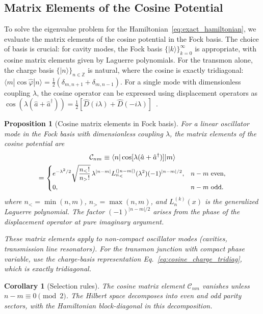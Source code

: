 \documentclass[reprint, floatfix, superscriptaddress, amsmath, amssymb, longbibliography]{revtex4-2}
\newtheorem{proposition}[theorem]{Proposition}
\newtheorem{corollary}[theorem]{Corollary}
\begin{document}
\subsection{Matrix Elements of the Cosine Potential}
\label{sec:cosine_matrix}

To solve the eigenvalue problem for the Hamiltonian~\eqref{eq:exact_hamiltonian}, we evaluate the matrix elements of the cosine potential in the Fock basis. The choice of basis is crucial: for cavity modes, the Fock basis $\{|k\rangle\}_{k=0}^\infty$ is appropriate, with cosine matrix elements given by Laguerre polynomials. For the transmon alone, the charge basis $\{|n\rangle\}_{n \in \mathbb{Z}}$ is natural, where the cosine is exactly tridiagonal: $\langle m|\cos\hat{\varphi}|n\rangle = \frac{1}{2}(\delta_{m,n+1} + \delta_{m,n-1})$. For a single mode with dimensionless coupling $\lambda$, the cosine operator can be expressed using displacement operators as $\cos(\lambda(\hat{a} + \hat{a}^\dagger)) = \frac{1}{2}[\hat{D}(i\lambda) + \hat{D}(-i\lambda)]$~\cite{CahillGlauber1969}.

\begin{proposition}[Cosine matrix elements in Fock basis]
\label{prop:cosine_matrix}
For a linear oscillator mode in the Fock basis with dimensionless coupling $\lambda$, the matrix elements of the cosine potential are
\begin{multline}
\mathcal{C}_{nm} \equiv 
\langle n | \cos[\lambda(\hat{a} + \hat{a}^\dagger)] | m \rangle \\
=
\small
\begin{cases}
e^{-\lambda^2/2}
\sqrt{\dfrac{n_<!}{n_>!}}\,
\lambda^{|n-m|}
L_{n_<}^{(|n-m|)}(\lambda^2)
(-1)^{|n-m|/2}, 
& n-m \ \text{even}, \\[6pt]
0, 
& n-m \ \text{odd}.
\end{cases}
\label{eq:cosine_matrix_revised}
\end{multline}
where $n_< = \min(n,m)$, $n_> = \max(n,m)$, and $L_n^{(k)}(x)$ is the generalized Laguerre polynomial. The factor $(-1)^{|n-m|/2}$ arises from the phase of the displacement operator at pure imaginary argument.

These matrix elements apply to non-compact oscillator modes (cavities, transmission line resonators). For the transmon junction with compact phase variable, use the charge-basis representation Eq.~\eqref{eq:cosine_charge_tridiag}, which is exactly tridiagonal.
\end{proposition}

\begin{corollary}[Selection rules]
The cosine matrix element $\mathcal{C}_{nm}$ vanishes unless $n - m \equiv 0 \pmod{2}$. The Hilbert space decomposes into even and odd parity sectors, with the Hamiltonian block-diagonal in this decomposition.
\end{corollary}
\end{document}
